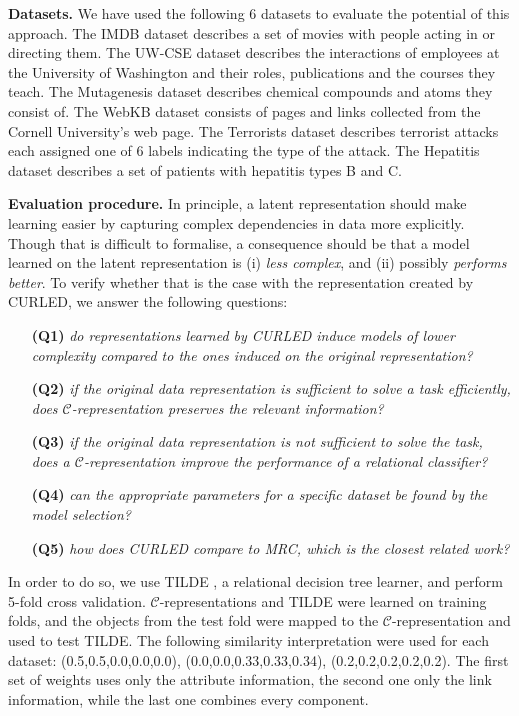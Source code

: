 \textbf{Datasets.}
We have used the following 6 datasets to evaluate the potential of this approach.
The IMDB dataset describes a set of movies with people acting in or directing them.
The UW-CSE dataset describes the interactions of employees at the University of Washington and their roles, publications and the courses they teach.
The Mutagenesis dataset describes chemical compounds and atoms they consist of. 
The WebKB dataset consists of pages and links collected from the Cornell University's web page.
The Terrorists dataset describes terrorist attacks each assigned one of 6 labels indicating the type of the attack.
The Hepatitis dataset describes a set of patients with hepatitis types B and C.
\vspace{1pt}

\textbf{Evaluation procedure.}
In principle, a latent representation should make learning easier by capturing complex dependencies in data more explicitly.
Though that is difficult to formalise, a consequence should be that a model learned on the latent representation is (i) \textit{less complex}, and (ii) possibly \textit{performs better}.
To verify whether that is the case with the representation created by CURLED, we answer the following questions:
\begin{itemize}
	\setlength\itemsep{0.06em}
    \item[\textbf{(Q1)}] \textit{do representations learned by CURLED induce models of lower complexity compared to the ones induced on the original representation?}
    \item[\textbf{(Q2)}] \textit{if the original data representation is sufficient to solve a task efficiently, does $\mathcal{C}$-representation preserves the relevant information?}
    \item[\textbf{(Q3)}] \textit{if the original data representation is not sufficient to solve the task, does a $\mathcal{C}$-representation improve the performance of a relational classifier?}
    \item[\textbf{(Q4)}] \textit{can the appropriate parameters for a specific dataset be found by the model selection?}
    \item[\textbf{(Q5)}] \textit{how does CURLED compare to MRC, which is the closest related work?}
\end{itemize}


In order to do so, we use TILDE \cite{Blockeel1998285}, a relational decision tree learner, and perform 5-fold cross validation. 
$\mathcal{C}$-representations and TILDE were learned on training folds, and the objects from the test fold were mapped to the $\mathcal{C}$-representation and used to test TILDE.
The following similarity interpretation were used for each dataset: (0.5,0.5,0.0,0.0,0.0), (0.0,0.0,0.33,0.33,0.34), (0.2,0.2,0.2,0.2,0.2).
The first set of weights uses only the attribute information, the second one only the link information, while the last one combines every component.



